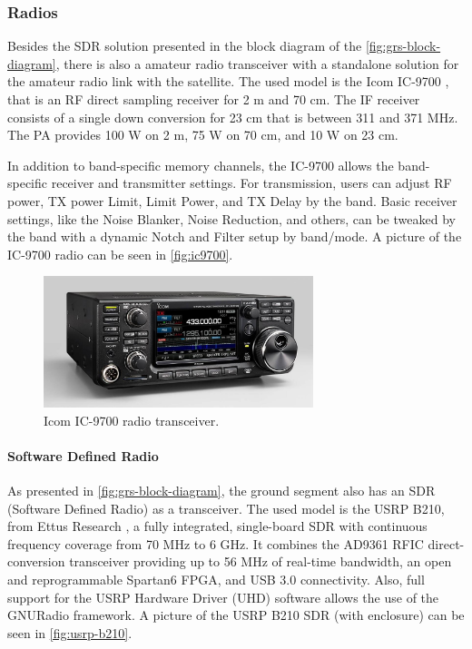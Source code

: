 \subsubsection{Radios}

Besides the SDR solution presented in the block diagram of the \autoref{fig:grs-block-diagram}, there is also a amateur radio transceiver with a standalone solution for the amateur radio link with the satellite. The used model is the Icom IC-9700 \cite{ic9700}, that is an RF direct sampling receiver for 2 m and 70 cm. The IF receiver consists of a single down conversion for 23 cm that is between 311 and 371 MHz. The PA provides 100 W on 2 m, 75 W on 70 cm, and 10 W on 23 cm.

In addition to band-specific memory channels, the IC-9700 allows the band-specific receiver and transmitter settings. For transmission, users can adjust RF power, TX power Limit, Limit Power, and TX Delay by the band. Basic receiver settings, like the Noise Blanker, Noise Reduction, and others, can be tweaked by the band with a dynamic Notch and Filter setup by band/mode. A picture of the IC-9700 radio can be seen in \autoref{fig:ic9700}.

\begin{figure}[!ht]
    \begin{center}
        \includegraphics[width=0.7\textwidth]{figures/ic-9700.jpg}
        \caption{Icom IC-9700 radio transceiver.}
        \label{fig:ic9700}
    \end{center}
\end{figure}

\paragraph{Software Defined Radio}

As presented in \autoref{fig:grs-block-diagram}, the ground segment also has an SDR (Software Defined Radio) as a transceiver. The used model is the USRP B210, from Ettus Research \cite{b210}, a fully integrated, single-board SDR with continuous frequency coverage from 70 MHz to 6 GHz. It combines the AD9361 RFIC direct-conversion transceiver providing up to 56 MHz of real-time bandwidth, an open and reprogrammable Spartan6 FPGA, and USB 3.0 connectivity. Also, full support for the USRP Hardware Driver (UHD) software allows the use of the GNURadio framework. A picture of the USRP B210 SDR (with enclosure) can be seen in \autoref{fig:usrp-b210}.


